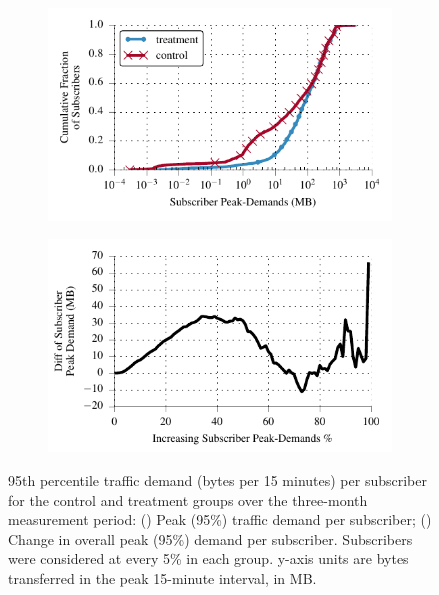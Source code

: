 \begin{figure}[t]
\begin{minipage}{\linewidth}
\centering
\begin{subfigure}[b]{.49\linewidth}
\includegraphics[width=\linewidth]{figures/cdf_peak_demand-overall.pdf}
               \caption{\label{fig:CDF-data-rate-perc95}}
\end{subfigure}
\begin{subfigure}[b]{.49\linewidth}
\includegraphics[width=\linewidth]{figures/diff_perc95_bytes_subsc-overall_01.pdf}		%
               \caption{\label{fig:diff-peak-overall}}
\end{subfigure}
%
\end{minipage}
\caption{95th percentile traffic demand (bytes per 15 minutes) per
  subscriber for the control and treatment groups over the three-month measurement period: (\protect{}) Peak (95\%) traffic demand per subscriber; (\protect{}) Change in overall peak (95\%) demand per subscriber. Subscribers were considered at every 5\% in each group. y-axis units are bytes transferred in the peak 15-minute interval, in MB. \label{fig:traffic-demand-overall}}
\end{figure}

